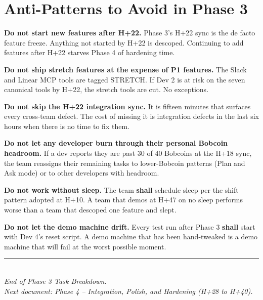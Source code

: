 \documentclass[11pt,letterpaper]{article}
\newcommand{\shall}{\textbf{shall}}
\begin{document}
\section{Anti-Patterns to Avoid in Phase 3}

\begin{warning}
\textbf{Do not start new features after H+22.} Phase 3's H+22 sync is the de facto feature freeze. Anything not started by H+22 is descoped. Continuing to add features after H+22 starves Phase 4 of hardening time.
\end{warning}

\begin{warning}
\textbf{Do not ship stretch features at the expense of P1 features.} The Slack and Linear MCP tools are tagged STRETCH. If Dev 2 is at risk on the seven canonical tools by H+22, the stretch tools are cut. No exceptions.
\end{warning}

\begin{warning}
\textbf{Do not skip the H+22 integration sync.} It is fifteen minutes that surfaces every cross-team defect. The cost of missing it is integration defects in the last six hours when there is no time to fix them.
\end{warning}

\begin{warning}
\textbf{Do not let any developer burn through their personal Bobcoin headroom.} If a dev reports they are past 30 of 40 Bobcoins at the H+18 sync, the team reassigns their remaining tasks to lower-Bobcoin patterns (Plan and Ask mode) or to other developers with headroom.
\end{warning}

\begin{warning}
\textbf{Do not work without sleep.} The team \shall{} schedule sleep per the shift pattern adopted at H+10. A team that demos at H+47 on no sleep performs worse than a team that descoped one feature and slept.
\end{warning}

\begin{warning}
\textbf{Do not let the demo machine drift.} Every test run after Phase 3 \shall{} start with Dev 4's reset script. A demo machine that has been hand-tweaked is a demo machine that will fail at the worst possible moment.
\end{warning}

\vfill

\begin{center}
\rule{0.6\textwidth}{0.6pt}\\
\vspace{0.3em}
{\small\itshape\color{ibmgray} End of Phase 3 Task Breakdown.\\}
{\small\itshape\color{ibmgray} Next document: Phase 4 -- Integration, Polish, and Hardening (H+28 to H+40).}
\end{center}
\end{document}
